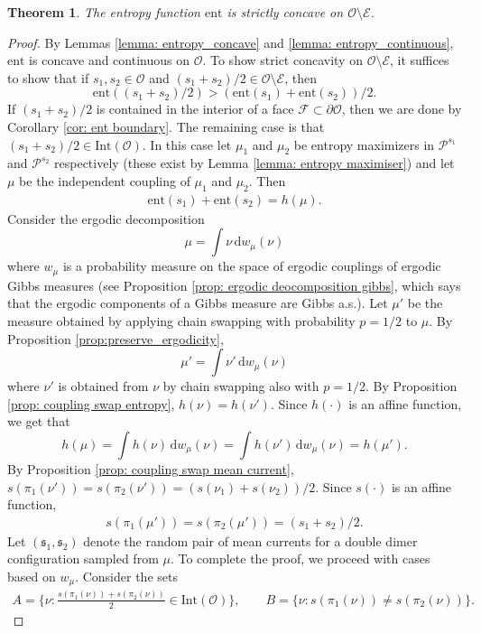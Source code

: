 \documentclass[11pt]{article}
\newtheorem{thm}{Theorem}[subsection]
\theoremstyle{remark}
\theoremstyle{definition}
\newcommand{\ent}{\text{ent}}
\newcommand{\mc}[1]{\mathcal{#1}}
\newcommand{\dd}{\mathrm{d}}
\begin{document}
\begin{thm}\label{theorem: entropy is strictly concave}
The entropy function $\ent$ is strictly concave on $\mc O \setminus \mc E$.
\end{thm}
\begin{proof}
By Lemmas \ref{lemma: entropy_concave} and \ref{lemma: entropy_continuous}, $\ent$ is concave and continuous on $\mathcal O$. To show strict concavity on $\mc O\setminus \mc E$, it suffices to show that if $s_1, s_2\in \mathcal O$ and $(s_1+s_2)/2\in \mc O\setminus \mc E$, then
$$\ent((s_1+s_2)/2)>(\ent(s_1)+\ent(s_2))/2.$$
If $(s_1+s_2)/2$ is contained in the interior of a face $\mc F \subset \partial \mc O$, then we are done by Corollary \ref{cor: ent boundary}. The remaining case is that $(s_1+s_2)/2\in \text{Int}(\mc O)$. In this case let $\mu_1$ and $\mu_2$ be entropy maximizers in $\mathcal P^{s_1}$ and $\mathcal P^{s_2}$ respectively (these exist by Lemma \ref{lemma: entropy maximiser}) and let $\mu$ be the independent coupling of $\mu_1$ and $\mu_2$. Then 
\begin{align*}
    \ent(s_1) + \ent(s_2) = h(\mu). 
\end{align*}
Consider the ergodic decomposition 
$$\mu=\int \nu \,\dd w_\mu(\nu)$$
where $w_\mu$ is a probability measure on the space of ergodic couplings of ergodic Gibbs measures (see Proposition \ref{prop: ergodic deocomposition gibbs}, which says that the ergodic components of a Gibbs measure are Gibbs a.s.). Let $\mu'$ be the measure obtained by applying chain swapping with probability $p=1/2$ to $\mu$. By Proposition \ref{prop:preserve_ergodicity},
$$\mu'=\int \nu' \,\dd w_\mu(\nu)$$
where $\nu'$ is obtained from $\nu$ by chain swapping also with $p=1/2$. By Proposition \ref{prop: coupling swap entropy}, $h(\nu) = h(\nu')$. Since $h(\cdot)$ is an affine function, we get that
$$h(\mu)=\int h(\nu) \,\dd w_\mu(\nu)=\int h(\nu') \,\dd w_\mu (\nu)=h({\mu'}).$$
By Proposition \ref{prop: coupling swap mean current}, $s(\pi_1(\nu')) = s(\pi_2(\nu')) = (s(\nu_1)+s(\nu_2))/2$. Since $s(\cdot)$ is an affine function,
\begin{align*}
    s(\pi_1(\mu')) = s(\pi_2(\mu')) = (s_1+s_2)/2.
\end{align*}
Let $(\mathfrak s_1, \mathfrak s_2)$ denote the random pair of mean currents for a double dimer configuration sampled from $\mu$. To complete the proof, we proceed with cases based on $w_\mu$. Consider the sets
\begin{align*}
      A = \{ \nu : \frac{s(\pi_1(\nu)) + s(\pi_2(\nu))}{2} \in \text{Int}(\mc O)\}, \qquad B = \{ \nu : s(\pi_1(\nu)) \neq s(\pi_2(\nu)) \}.

\end{align*}
\end{proof}
\end{document}
